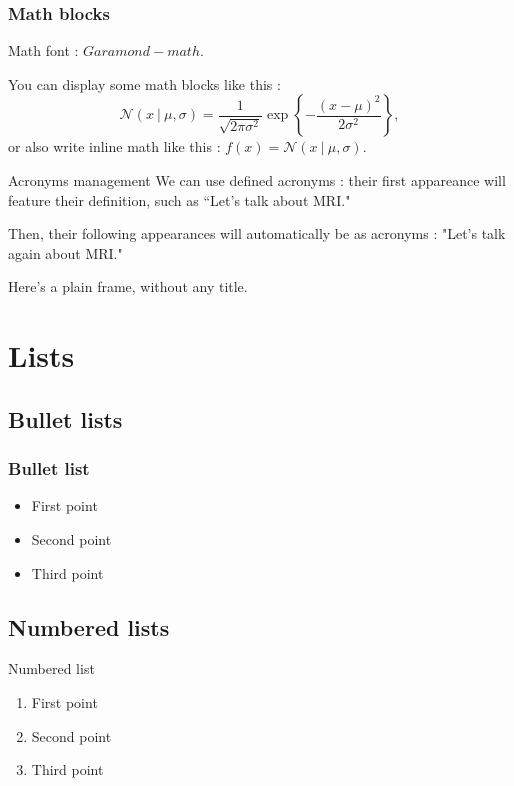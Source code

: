 \documentclass[
  11pt, %
  aspectratio=169, %
]{beamer}
\begin{document}
\begin{frame}
  \frametitle{Math blocks}

  Math font : $Garamond-math$.

  \vfill
  You can display some math blocks like this :
  \[\mathcal{N}(x~|~\mu, \sigma) = \frac{1}{\sqrt{2\pi\sigma^2}}\exp\left\{-\frac{(x-\mu)^2}{2\sigma^2}\right\},\]
  or also write inline math like this : $f(x) = \mathcal{N}(x~|~\mu, \sigma)$.

\end{frame}

\begin{frame}{Acronyms management}
  We can use defined acronyms : their first appareance will feature their definition, such as “Let's talk about \ac{MRI}."
  \vfill

  Then, their following appearances will automatically be as acronyms : "Let's talk again about \ac{MRI}."
\end{frame}

\begin{frame}

  Here’s a plain frame, without any title.

\end{frame}

\section{Lists}

\subsection{Bullet lists}
\begin{frame}
  \frametitle{Bullet list}

  \begin{itemize}
    \item First point
    \item Second point
    \item Third point
  \end{itemize}

\end{frame}

\subsection{Numbered lists}
\begin{frame}{Numbered list}
  \begin{enumerate}
    \item First point
    \item Second point
    \item Third point
  \end{enumerate}

\end{frame}
\end{document}
